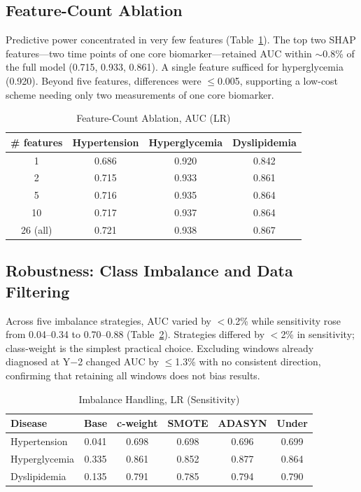 \documentclass[journal]{IEEEtran}
\begin{document}
\subsection{Feature-Count Ablation}
Predictive power concentrated in very few features (Table~\ref{tab:fcount}). The top two SHAP features---two time points of one core biomarker---retained AUC within $\sim$0.8\% of the full model (0.715, 0.933, 0.861). A single feature sufficed for hyperglycemia (0.920). Beyond five features, differences were $\leq$0.005, supporting a low-cost scheme needing only two measurements of one core biomarker.

\begin{table}[!t]
\caption{Feature-Count Ablation, AUC (LR)}
\label{tab:fcount}
\centering
\begin{tabular}{@{}cccc@{}}
\toprule
\# features & Hypertension & Hyperglycemia & Dyslipidemia \\
\midrule
1 & 0.686 & 0.920 & 0.842 \\
2 & 0.715 & 0.933 & 0.861 \\
5 & 0.716 & 0.935 & 0.864 \\
10 & 0.717 & 0.937 & 0.864 \\
26 (all) & 0.721 & 0.938 & 0.867 \\
\bottomrule
\end{tabular}
\end{table}

\subsection{Robustness: Class Imbalance and Data Filtering}
Across five imbalance strategies, AUC varied by $<$0.2\% while sensitivity rose from 0.04--0.34 to 0.70--0.88 (Table~\ref{tab:imb}). Strategies differed by $<$2\% in sensitivity; class-weight is the simplest practical choice. Excluding windows already diagnosed at Y$-$2 changed AUC by $\leq$1.3\% with no consistent direction, confirming that retaining all windows does not bias results.

\begin{table}[!t]
\caption{Imbalance Handling, LR (Sensitivity)}
\label{tab:imb}
\centering
\begin{tabular}{@{}lccccc@{}}
\toprule
Disease & Base & c-weight & SMOTE & ADASYN & Under \\
\midrule
Hypertension & 0.041 & 0.698 & 0.698 & 0.696 & 0.699 \\
Hyperglycemia & 0.335 & 0.861 & 0.852 & 0.877 & 0.864 \\
Dyslipidemia & 0.135 & 0.791 & 0.785 & 0.794 & 0.790 \\
\bottomrule
\end{tabular}
\end{table}
\end{document}

